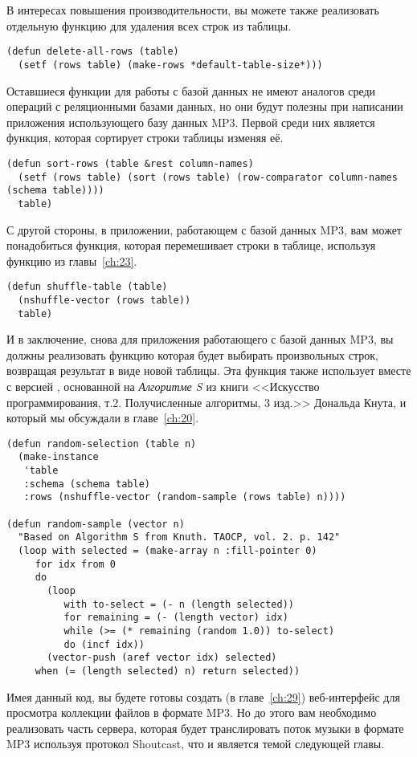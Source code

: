 В интересах повышения производительности, вы можете также реализовать отдельную функцию
для удаления всех строк из таблицы.

\begin{lstlisting}
(defun delete-all-rows (table)
  (setf (rows table) (make-rows *default-table-size*)))
\end{lstlisting}

Оставшиеся функции для работы с базой данных не имеют аналогов среди операций с
реляционными базами данных, но они будут полезны при написании приложения использующего
базу данных MP3.  Первой среди них является функция, которая сортирует строки таблицы
изменяя её.

\begin{lstlisting}
(defun sort-rows (table &rest column-names)
  (setf (rows table) (sort (rows table) (row-comparator column-names (schema table))))
  table)
\end{lstlisting}

С другой стороны, в приложении, работающем с базой данных MP3, вам может понадобиться
функция, которая перемешивает строки в таблице, используя функцию 
из главы~\ref{ch:23}.

\begin{lstlisting}
(defun shuffle-table (table)
  (nshuffle-vector (rows table))
  table)
\end{lstlisting}

И в заключение, снова для приложения работающего с базой данных MP3, вы должны реализовать
функцию которая будет выбирать  произвольных строк, возвращая результат в виде
новой таблицы.  Эта функция также использует  вместе с версией
, основанной на \textit{Алгоритме S} из книги <<Искусство
программирования, т.2.  Получисленные алгоритмы, 3 изд.>> Дональда Кнута, и который мы
обсуждали в главе~\ref{ch:20}.

\begin{lstlisting}
(defun random-selection (table n)
  (make-instance
   'table
   :schema (schema table)
   :rows (nshuffle-vector (random-sample (rows table) n))))

(defun random-sample (vector n)
  "Based on Algorithm S from Knuth. TAOCP, vol. 2. p. 142"
  (loop with selected = (make-array n :fill-pointer 0)
     for idx from 0
     do
       (loop
          with to-select = (- n (length selected))
          for remaining = (- (length vector) idx)
          while (>= (* remaining (random 1.0)) to-select)
          do (incf idx))
       (vector-push (aref vector idx) selected)
     when (= (length selected) n) return selected))
\end{lstlisting}

Имея данный код, вы будете готовы создать (в главе~\ref{ch:29}) веб-интерфейс для
просмотра коллекции файлов в формате MP3.  Но до этого вам необходимо реализовать часть
сервера, которая будет транслировать поток музыки в формате MP3 используя протокол
Shoutcast, что и является темой следующей главы.

